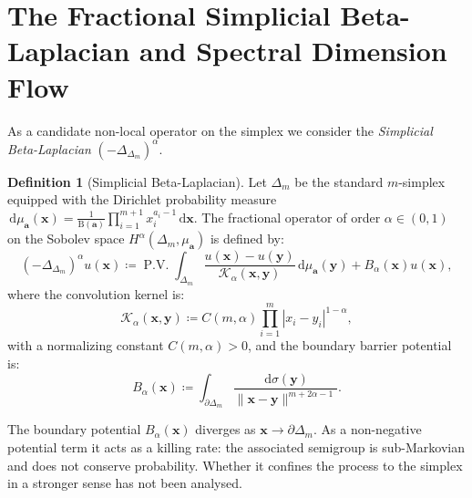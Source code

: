 \documentclass[11pt,a4paper,reqno]{amsart}
\theoremstyle{definition}
\newtheorem{definition}[theorem]{Definition}
\numberwithin{equation}{section}
\newcommand{\dif}{\,\mathrm{d}}
\begin{document}
\section{The Fractional Simplicial Beta-Laplacian and Spectral Dimension Flow}
\label{sec:beta_laplacian}

As a candidate non-local operator on the simplex we consider the \emph{Simplicial Beta-Laplacian} $(-\Delta_{\Delta_m})^\alpha$.

\begin{definition}[Simplicial Beta-Laplacian]
\label{def:beta_laplacian}
Let $\Delta_m$ be the standard $m$-simplex equipped with the Dirichlet probability measure $\dif \mu_{\mathbf{a}}(\mathbf{x}) = \frac{1}{\mathrm{B}(\mathbf{a})} \prod_{i=1}^{m+1} x_i^{a_i - 1} \dif \mathbf{x}$. The fractional operator of order $\alpha \in (0, 1)$ on the Sobolev space $H^\alpha(\Delta_m, \mu_{\mathbf{a}})$ is defined by:
\begin{equation}
    \label{eq:beta_laplacian_formula}
    (-\Delta_{\Delta_m})^\alpha u(\mathbf{x}) \coloneqq \operatorname{P.V.} \int_{\Delta_m} \frac{u(\mathbf{x}) - u(\mathbf{y})}{\mathcal{K}_\alpha(\mathbf{x}, \mathbf{y})} \dif \mu_{\mathbf{a}}(\mathbf{y}) + B_\alpha(\mathbf{x}) u(\mathbf{x}),
\end{equation}
where the convolution kernel is:
\begin{equation}
    \mathcal{K}_\alpha(\mathbf{x}, \mathbf{y}) \coloneqq C(m, \alpha) \prod_{i=1}^m |x_i - y_i|^{1 - \alpha},
\end{equation}
with a normalizing constant $C(m,\alpha) > 0$,
and the boundary barrier potential is:
\begin{equation}
    \label{eq:boundary_barrier}
    B_\alpha(\mathbf{x}) \coloneqq \int_{\partial \Delta_m} \frac{\dif \sigma(\mathbf{y})}{\|\mathbf{x} - \mathbf{y}\|^{m + 2\alpha - 1}}.
\end{equation}
\end{definition}

The boundary potential $B_\alpha(\mathbf{x})$ diverges as $\mathbf{x} \to \partial \Delta_m$. As a non-negative potential term it acts as a killing rate: the associated semigroup is sub-Markovian and does not conserve probability. Whether it confines the process to the simplex in a stronger sense has not been analysed.
\end{document}
